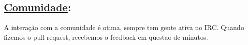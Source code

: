 \subsection*{\underline{Comunidade}:}

A interação com a comunidade é otima, sempre tem gente ativa no IRC.
Quando fizemos o pull request, recebemos o feedback em questao de minutos.
